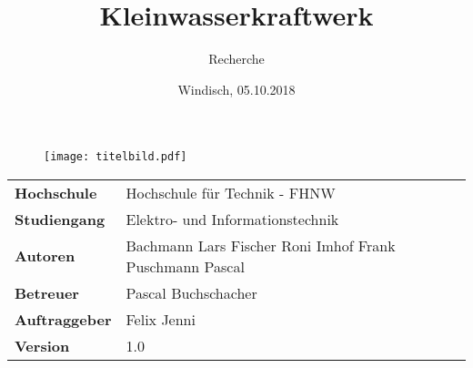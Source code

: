 \documentclass[final]{fhnwreport}       %
\title{Kleinwasserkraftwerk}          %
\author{Recherche}          %
\date{Windisch, 05.10.2018}             %
\begin{document}
\maketitle

\vspace*{-1cm}						    %
\vfill
\begin{figure}[H]
\centering
\texttt{[image: titelbild.pdf]}
\end{figure}
\vfill

{
\renewcommand\arraystretch{2}
\begin{center}
\begin{tabular}{ >{\bf} l p{10cm} l }
Hochschule                 &   Hochschule für Technik - FHNW\\
Studiengang               &  	Elektro- und Informationstechnik\\
Autoren   		       & 	Bachmann Lars \newline  Fischer Roni \newline Imhof Frank \newline Puschmann Pascal\\ 
Betreuer                   	&    Pascal Buchschacher\\
Auftraggeber             	&    Felix Jenni\\
Version                    	&    1.0 %
\end{tabular}
\end{center}
}

\clearpage
{}				%
\thispagestyle{empty}
			
\tableofcontents
\clearpage






{%
}
\end{document}
